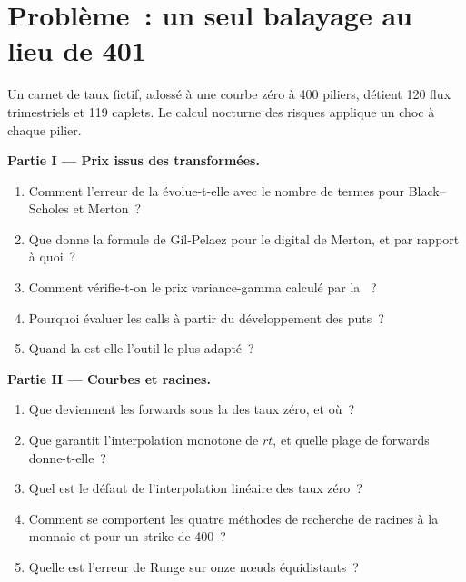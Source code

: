 \section{Problème~: un seul balayage au lieu de 401}

\begin{problem}\label{pb:qm:transforms-interpolation-and-algorithmic-differentiation:1}
Un carnet de taux fictif, adossé à une courbe zéro à 400 piliers, détient 120 flux trimestriels et 119 caplets. Le calcul nocturne des risques applique un choc à chaque pilier.

\medskip\noindent\textbf{Partie I --- Prix issus des transformées.}
\begin{enumerate}
\item Comment l'erreur de la  évolue-t-elle avec le nombre de termes pour Black--Scholes et Merton~?
\item Que donne la formule de Gil-Pelaez pour le digital de Merton, et par rapport à quoi~?
\item Comment vérifie-t-on le prix variance-gamma calculé par la ~?
\item Pourquoi évaluer les calls à partir du développement des puts~?
\item Quand la  est-elle l'outil le plus adapté~?
\end{enumerate}

\medskip\noindent\textbf{Partie II --- Courbes et racines.}
\begin{enumerate}[resume]
\item Que deviennent les forwards sous la  des taux zéro, et où~?
\item Que garantit l'interpolation monotone de $rt$, et quelle plage de forwards donne-t-elle~?
\item Quel est le défaut de l'interpolation linéaire des taux zéro~?
\item Comment se comportent les quatre méthodes de recherche de racines à la monnaie et pour un strike de 400~?
\item Quelle est l'erreur de Runge sur onze nœuds équidistants~?
\end{enumerate}


\end{problem}
